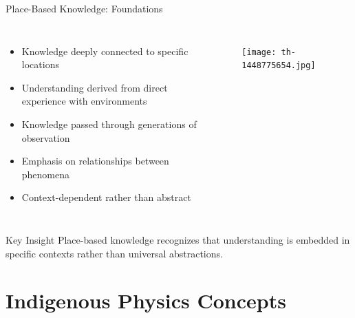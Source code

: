 \documentclass{beamer}
\begin{document}
\begin{frame}{Place-Based Knowledge: Foundations}
    \begin{columns}
        \begin{itemize}
            \item Knowledge deeply connected to specific locations
            \item Understanding derived from direct experience with environments
            \item Knowledge passed through generations of observation
            \item Emphasis on relationships between phenomena
            \item Context-dependent rather than abstract
        \end{itemize}
        
        \begin{figure}
            \centering
            \texttt{[image: th-1448775654.jpg]}
        \end{figure}
    \end{columns}
    
    \begin{alertblock}{Key Insight}
        Place-based knowledge recognizes that understanding is embedded in specific contexts rather than universal abstractions.
    \end{alertblock}
\end{frame}

\section{Indigenous Physics Concepts}
\end{document}
